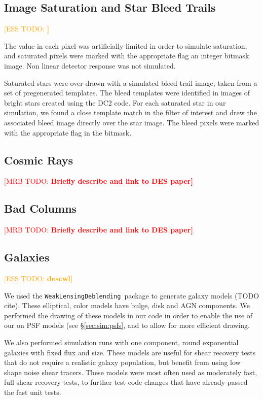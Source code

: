 \documentclass[iop, twocolappendix, appendixfloats, numberedappendix, apj]{hackemulateapj}
\newcommand{\mattodo}[1]{\textcolor{red}{[MRB TODO: \bf #1]}}
\newcommand{\esstodo}[1]{\textcolor{orange}{[ESS TODO: \bf #1]}}
\newcommand{\descwl}{\texttt{WeakLensingDeblending}}
\begin{document}
\subsection{Image Saturation and Star Bleed Trails} \label{sec:sim:satbleeds}
\esstodo{}

The value in each pixel was artificially limited in order to simulate
saturation, and saturated pixels were marked with the appropriate flag an
integer bitmask image.  Non linear detector response was not simulated.

Saturated stars were over-drawn with a simulated bleed trail image, taken from
a set of pregenerated templates.  The bleed templates were identified in images
of bright stars created using the DC2 code.  For each saturated star in our
simulation, we found a close template match in the filter of interest and drew
the associated bleed image directly over the star image. The bleed pixels were
marked with the appropriate flag in the bitmask.

\subsection{Cosmic Rays} \label{sec:sim:cosmics}

\mattodo{Briefly describe and link to DES paper}

\subsection{Bad Columns} \label{sec:sim:badcols}

\mattodo{Briefly describe and link to DES paper}

\subsection{Galaxies} \label{sec:sim:galaxies}
\esstodo{descwl}

We used the \descwl\ package to generate galaxy models (TODO cite).  These
elliptical, color models have bulge, disk and AGN components. We performed the
drawing of these models in our code in order to enable the use of our on PSF
models (see \S \ref{sec:sim:psfs}, and to allow for more efficient drawing.

We also performed simulation runs with one component, round exponential
galaxies with fixed flux and size.  These models are useful for shear recovery
tests that do not require a realistic galaxy population, but benefit from using
low shape noise shear tracers.  These models were most often used as moderately
fast, full shear recovery tests, to further test code changes
that have already passed the fast unit tests.
\end{document}
